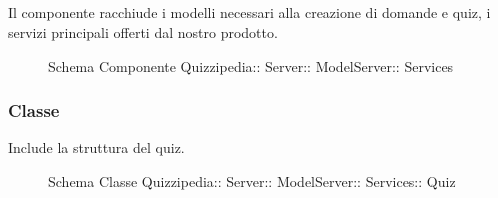 \subsection{}
Il componente racchiude i modelli necessari alla creazione di domande e quiz, i servizi principali offerti dal nostro prodotto.
\begin{figure}[H]
\centering
\noindent{}
\caption[Schema Componente Quizzipedia::Server::ModelServer::Services]{Schema Componente Quizzipedia:: Server:: ModelServer:: Services}
\end{figure}
\subsubsection{Classe }
Include la struttura del quiz.
\begin{figure}[H]
\centering
\noindent{}
\caption[Schema Classe Quiz]{Schema Classe Quizzipedia:: Server:: ModelServer:: Services:: Quiz}
\end{figure}

